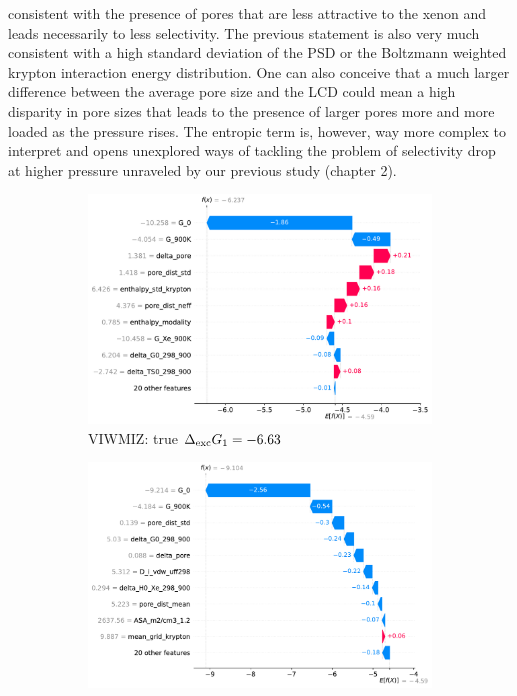 \documentclass[main]{subfiles}
\begin{document}
consistent with the presence of pores that are less attractive to the xenon and leads necessarily to less selectivity. The previous statement is also very much consistent with a high standard deviation of the PSD or the Boltzmann weighted krypton interaction energy distribution. One can also conceive that a much larger difference between the average pore size and the LCD could mean a high disparity in pore sizes that leads to the presence of larger pores more and more loaded as the pressure rises.
The entropic term is, however, way more complex to interpret and opens unexplored ways of tackling the problem of selectivity drop at higher pressure unraveled by our previous study (chapter 2).

\begin{figure}[ht]
    \centering
    \begin{subfigure}[b]{0.47\textwidth}
      \centering
      \includegraphics[width=\textwidth]{figures/4-ml/main/VIWMIZ_clean.pdf}
      \caption{VIWMIZ: true $\Delta_{\text{exc}} G_1=-6.63$}
    \end{subfigure}
         \hfill
    \begin{subfigure}[b]{0.47\textwidth}
      \centering
      \includegraphics[width=\textwidth]{figures/4-ml/main/BIMDIL_clean.pdf}

\end{subfigure}
\end{figure}
\end{document}
